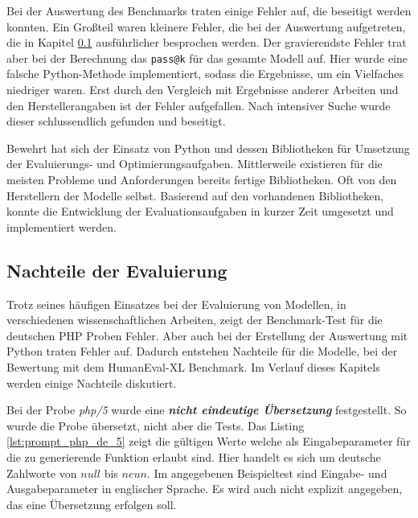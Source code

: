Bei der Auswertung des Benchmarks traten einige Fehler auf, die beseitigt werden konnten. Ein Großteil waren kleinere Fehler, die bei der Auswertung aufgetreten, die in Kapitel \ref{subsec:disadvantages_of_evaluation} ausführlicher besprochen werden. Der gravierendste Fehler trat aber bei der Berechnung das \texttt{pass@k} für das gesamte Modell auf. Hier wurde eine falsche Python-Methode implementiert, sodass die Ergebnisse, um ein Vielfaches niedriger waren. Erst durch den Vergleich mit Ergebnisse anderer Arbeiten und den Herstellerangaben ist der Fehler aufgefallen. Nach intensiver Suche wurde dieser schlussendlich gefunden und beseitigt.\vspace{0.2cm}

Bewehrt hat sich der Einsatz von Python und dessen Bibliotheken für Umsetzung der Evaluierungs- und Optimierungsaufgaben. Mittlerweile existieren für die meisten Probleme und Anforderungen bereits fertige Bibliotheken. Oft von den Herstellern der Modelle selbst. Basierend auf den vorhandenen Bibliotheken, konnte die Entwicklung der Evaluationsaufgaben in kurzer Zeit umgesetzt und implementiert werden.\vspace{0.2cm}



\subsection{Nachteile der Evaluierung}\label{subsec:disadvantages_of_evaluation}
Trotz seines häufigen Einsatzes bei der Evaluierung von Modellen, in verschiedenen wissenschaftlichen Arbeiten, zeigt der Benchmark-Test für die deutschen PHP Proben Fehler. Aber auch bei der Erstellung der Auswertung mit Python traten Fehler auf. Dadurch entstehen Nachteile für die Modelle, bei der Bewertung mit dem HumanEval-XL Benchmark. Im Verlauf dieses Kapitels werden einige Nachteile diskutiert.\vspace{0.2cm}

Bei der Probe \textit{php/5} wurde eine \textit{\textbf{nicht eindeutige Übersetzung}} festgestellt. So wurde die Probe übersetzt, nicht aber die Tests. Das Listing \ref{lst:prompt_php_de_5} zeigt die gültigen Werte welche als Eingabeparameter für die zu generierende Funktion erlaubt sind. Hier handelt es sich um deutsche Zahlworte von $null$ bis $neun$. Im angegebenen Beispieltest sind Eingabe- und Ausgabeparameter in englischer Sprache. Es wird auch nicht explizit angegeben, das eine Übersetzung erfolgen soll.\vspace{0.2cm}

